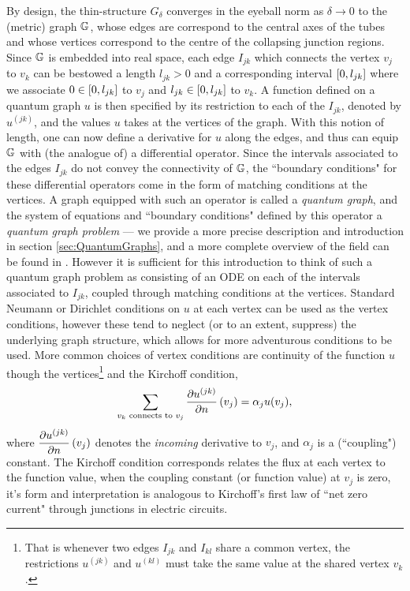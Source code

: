 By design, the thin-structure $G_{\delta}$ converges in the eyeball norm as $\delta\rightarrow0$ to the (metric) graph $\mathbb{G}$, whose edges are correspond to the central axes of the tubes and whose vertices correspond to the centre of the collapsing junction regions.
Since $\mathbb{G}$ is embedded into real space, each edge $I_{jk}$ which connects the vertex $v_j$ to $v_k$ can be bestowed a length $l_{jk}>0$ and a corresponding interval $\left[ 0,l_{jk} \right]$ where we associate $0\in\left[ 0,l_{jk} \right]$ to $v_j$ and $l_{jk}\in\left[ 0,l_{jk} \right]$ to $v_k$.
A function defined on a quantum graph $u$ is then specified by its restriction to each of the $I_{jk}$, denoted by $u^{(jk)}$, and the values $u$ takes at the vertices of the graph.
With this notion of length, one can now define a derivative for $u$ along the edges, and thus can equip $\mathbb{G}$ with (the analogue of) a differential operator.
Since the intervals associated to the edges $I_{jk}$ do not convey the connectivity of $\mathbb{G}$, the ``boundary conditions" for these differential operators come in the form of matching conditions at the vertices.
A graph equipped with such an operator is called a \emph{quantum graph}, and the system of equations and ``boundary conditions" defined by this operator a \emph{quantum graph problem} --- we provide a more precise description and introduction in section \ref{sec:QuantumGraphs}, and a more complete overview of the field can be found in \cite{berkolaiko2013introduction}.
However it is sufficient for this introduction to think of such a quantum graph problem as consisting of an ODE on each of the intervals associated to $I_{jk}$, coupled through matching conditions at the vertices.
Standard Neumann or Dirichlet conditions on $u$ at each vertex can be used as the vertex conditions, however these tend to neglect (or to an extent, suppress) the underlying graph structure, which allows for more adventurous conditions to be used.
More common choices of vertex conditions are continuity of the function $u$ though the vertices\footnote{That is whenever two edges $I_{jk}$ and $I_{kl}$ share a common vertex, the restrictions $u^{(jk)}$ and $u^{(kl)}$ must take the same value at the shared vertex $v_k$.} and the Kirchoff condition,
\begin{align*}
	\sum_{v_k \text{ connects to } v_j} 
	\dfrac{\partial u^{(jk)}}{\partial n}\left( v_j \right) = \alpha_j u(v_j),
\end{align*}
where $\dfrac{\partial u^{(jk)}}{\partial n}\left( v_j \right)$ denotes the \emph{incoming} derivative to $v_j$, and $\alpha_j$ is a (``coupling") constant. 
The Kirchoff condition corresponds relates the flux at each vertex to the function value, when the coupling constant (or function value) at $v_j$ is zero, it's form and interpretation is analogous to Kirchoff's first law of ``net zero current" through junctions in electric circuits.

